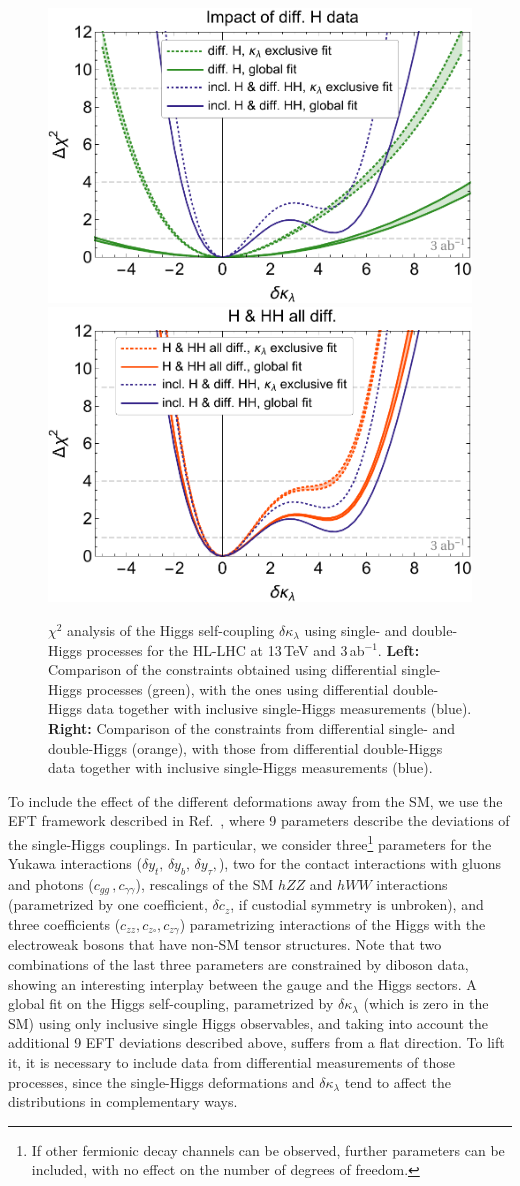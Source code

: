\begin{figure}
\centering
\includegraphics[width=0.45\linewidth]{section3/plots/5leftbisbisbis}\hfill
\includegraphics[width=0.45\linewidth]{section3/plots/chi2kl_alldiff_combined}
\caption{$\chi^2$ analysis of the Higgs self-coupling $\delta \kappa_\lambda$ using single- and double-Higgs processes for the HL-LHC at 13\,TeV and 3\,ab$^{-1}$. \textbf{Left:} Comparison of the constraints obtained using differential single-Higgs processes (green), with the ones using differential double-Higgs data together with inclusive single-Higgs measurements (blue). \textbf{Right:} Comparison of the constraints from differential single- and double-Higgs (orange), with those from differential double-Higgs data together with inclusive single-Higgs measurements (blue).}
\label{fig:hllhcchi2}
\end{figure}

To include the effect of the different deformations away from the SM, we use the EFT framework described in Ref.~\cite{DiVita:2017eyz}, where 9 parameters describe the deviations of the single-Higgs couplings. In particular, we consider three\footnote{If other fermionic decay channels can be observed, further parameters can be included, with no effect on the number of degrees of freedom.} parameters for the Yukawa interactions ($\delta y_t,\,\delta y_b,\,\delta y_\tau,$), two for the contact interactions with gluons and photons ($c_{gg}\,,c_{\gamma\gamma}$), rescalings of the SM $hZZ$ and $hWW$ interactions (parametrized by one coefficient, $\delta c_z$, if custodial symmetry is unbroken), and three coefficients ($c_{zz},c_{z\square},c_{z\gamma}$) parametrizing interactions of the Higgs with the electroweak bosons that have non-SM tensor structures. Note that two combinations of the last three parameters are constrained by diboson data, showing an interesting interplay between the gauge and the Higgs sectors. A global fit on the Higgs self-coupling, parametrized by $\delta\kappa_\lambda$ (which is zero in the SM) using only inclusive single Higgs observables, and taking into account the additional 9 EFT deviations described above, suffers from a flat direction. To lift it, it is necessary to include data from differential measurements of those processes, since the single-Higgs deformations and $\delta\kappa_\lambda$ tend to affect the distributions in complementary ways.
\medskip

